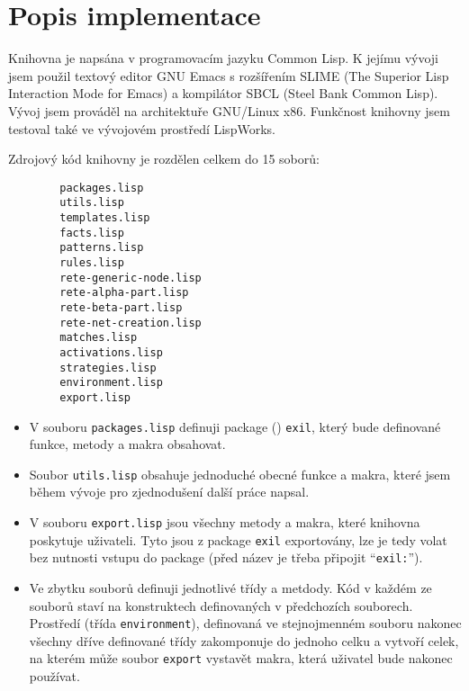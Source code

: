 \section{Popis implementace}
Knihovna je napsána v programovacím jazyku Common Lisp. K jejímu vývoji jsem
použil textový editor \textsf{GNU Emacs} s rozšířením \textsf{SLIME} (The
Superior Lisp Interaction Mode for Emacs) a kompilátor \textsf{SBCL} (Steel Bank
Common Lisp). Vývoj jsem prováděl na architektuře \textsf{GNU/Linux x86}.
Funkčnost knihovny jsem testoval také ve vývojovém prostředí
LispWorks\textsuperscript{\textregistered}.

Zdrojový kód knihovny je rozdělen celkem do 15 soborů:
\begin{verbatim}
        packages.lisp
        utils.lisp
        templates.lisp
        facts.lisp
        patterns.lisp
        rules.lisp
        rete-generic-node.lisp
        rete-alpha-part.lisp
        rete-beta-part.lisp
        rete-net-creation.lisp
        matches.lisp
        activations.lisp
        strategies.lisp
        environment.lisp
        export.lisp
\end{verbatim}
\begin{itemize}
\item V souboru \verb|packages.lisp| definuji package () \verb|exil|,
který bude definované funkce, metody a makra obsahovat.
\item Soubor \verb|utils.lisp| obsahuje jednoduché obecné funkce a makra, které
jsem během vývoje pro zjednodušení další práce napsal.
\item V souboru \verb|export.lisp| jsou všechny metody a makra, které knihovna
poskytuje uživateli. Tyto jsou z package \verb|exil| exportovány, lze je
tedy volat bez nutnosti vstupu do package (před název je třeba připojit
``\verb|exil:|'').
\item Ve zbytku souborů definuji jednotlivé třídy a metdody. Kód v každém ze
souborů staví na konstruktech definovaných v předchozích souborech. Prostředí
(třída \verb|environment|), definovaná ve stejnojmenném souboru nakonec všechny
dříve definované třídy zakomponuje do jednoho celku a vytvoří celek, na kterém
může soubor \verb|export| vystavět makra, která uživatel bude nakonec používat.
\end{itemize}

